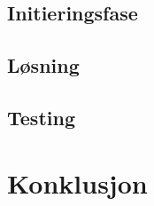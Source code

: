 \documentclass[a4paper,11pt]{report}
\begin{document}
\section{Initieringsfase}


\newpage
\section{Løsning}

\section{Testing}

\chapter{Konklusjon}




\appendix





\clearpage 
 
 
\end{document}
